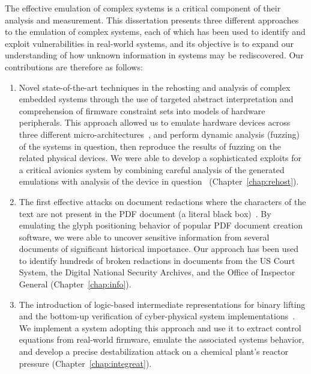 The effective emulation of complex systems is a critical component of their analysis and measurement.
This dissertation presents three different approaches to the emulation of complex systems, each of which has been used to identify and exploit vulnerabilities in real-world systems, and its objective is to expand our understanding of how unknown information in systems may be rediscovered.
Our contributions are therefore as follows:

\begin{enumerate}
	\item Novel state-of-the-art techniques in the rehosting and analysis of complex embedded systems through the use of targeted abstract interpretation and comprehension of firmware constraint sets into models of hardware peripherals.
	This approach allowed us to emulate hardware devices across three different micro-architectures~\cite{johnson2021jetset}, and perform dynamic analysis (fuzzing) of the systems in question, then reproduce the results of fuzzing on the related physical devices.
		We were able to develop a sophisticated exploits for a critical avionics system by combining careful analysis of the generated emulations with analysis of the device in question~\cite{cmurootkit} (Chapter~\ref{chap:rehost}).
	\item The first effective attacks on document redactions where the characters of the text are not present in the PDF document (a literal black box)~\cite{bland2023story}.
		By emulating the glyph positioning behavior of popular PDF document creation software, we were able to uncover sensitive information from several documents of significant historical importance.
		Our approach has been used to identify hundreds of broken redactions in documents from the US Court System, the Digital National Security Archives, and the Office of Inspector General (Chapter~\ref{chap:info}).
	\item The introduction of logic-based intermediate representations for binary lifting and the bottom-up verification of cyber-physical system implementations~\cite{bland2023integreat}.
		We implement a system adopting this approach and use it to extract control equations from real-world firmware, emulate the associated systems behavior, and develop a precise destabilization attack on a chemical plant's reactor pressure (Chapter~\ref{chap:integreat}).
\end{enumerate}

